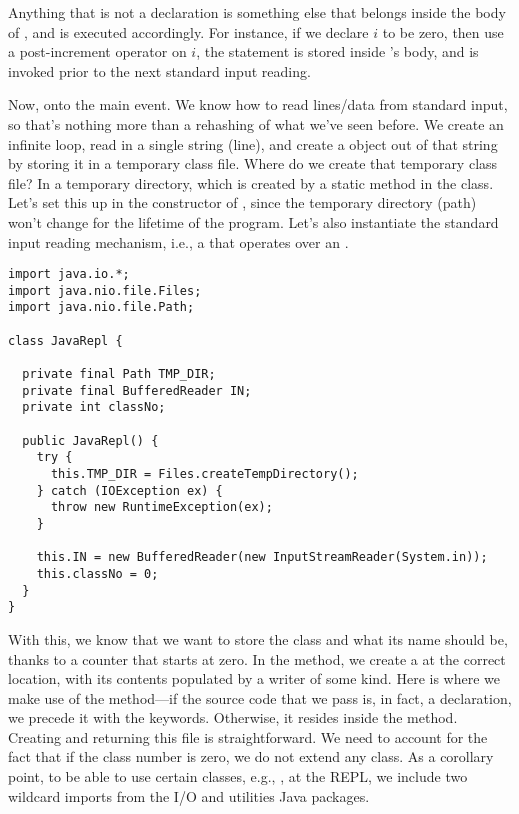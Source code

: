 Anything that is not a declaration is something else that belongs inside the body of , and is executed accordingly. For instance, if we declare $i$ to be zero, then use a post-increment operator on $i$, the  statement is stored inside 's  body, and is invoked prior to the next standard input reading. 

Now, onto the main event. We know how to read lines/data from standard input, so that's nothing more than a rehashing of what we've seen before. We create an infinite loop, read in a single string (line), and create a  object out of that string by storing it in a temporary class file. Where do we create that temporary class file? In a temporary directory, which is created by a static method in the class. Let's set this up in the constructor of , since the temporary directory (path) won't change for the lifetime of the program. Let's also instantiate the standard input reading mechanism, i.e., a  that operates over an .

\begin{cl}{}
\begin{lstlisting}[language=MyJava]
import java.io.*;
import java.nio.file.Files;
import java.nio.file.Path;

class JavaRepl {

  private final Path TMP_DIR;
  private final BufferedReader IN; 
  private int classNo;

  public JavaRepl() {
    try {
      this.TMP_DIR = Files.createTempDirectory();
    } catch (IOException ex) {
      throw new RuntimeException(ex);
    } 
    
    this.IN = new BufferedReader(new InputStreamReader(System.in));
    this.classNo = 0;
  }
}
\end{lstlisting}
\end{cl}

With this, we know that we want to store the class and what its name should be, thanks to a counter that starts at zero. In the  method, we create a  at the correct location, with its contents populated by a writer of some kind. Here is where we make use of the  method---if the source code that we pass is, in fact, a declaration, we precede it with the  keywords. Otherwise, it resides inside the  method. Creating and returning this file is straightforward. We need to account for the fact that if the class number is zero, we do not extend any class. As a corollary point, to be able to use certain classes, e.g., , at the REPL, we include two wildcard imports from the I/O and utilities Java packages.


